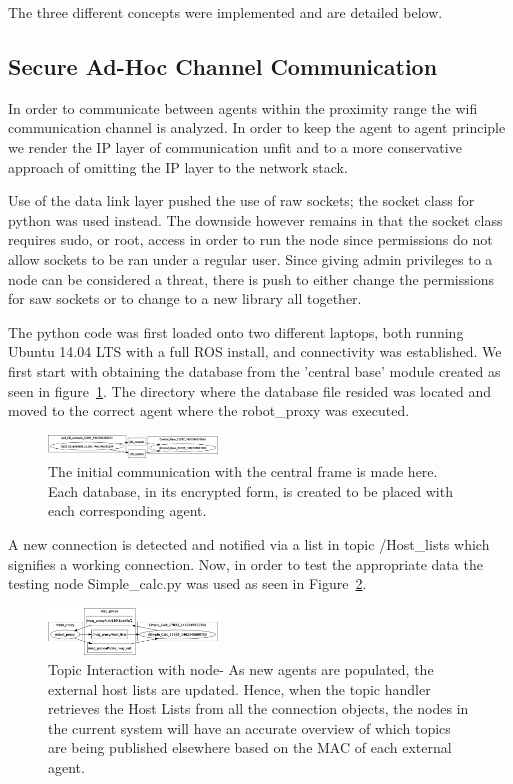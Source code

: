 \documentclass[conference]{IEEEtran}
\begin{document}
The three different concepts were implemented and are detailed below.

\subsection{Secure Ad-Hoc Channel Communication}

In order to communicate between agents within the proximity range the wifi communication channel is analyzed. In order to keep the agent to agent principle we render the IP layer of communication unfit and to a more conservative approach of omitting the IP layer to the network stack.

Use of the data link layer pushed the use of raw sockets; the socket class for python was used instead. The downside however remains in that the socket class requires sudo, or root, access in order to run the node since permissions do not allow sockets to be ran under a regular user. Since giving admin privileges to a node can be considered a threat, there is push to either change the permissions for saw sockets or to change to a new library all together.

The python code was first loaded onto two different laptops, both running Ubuntu 14.04 LTS with a full ROS install, and connectivity was established. We first start with obtaining the database from the 'central base' module created as seen in figure~\ref{fig:TopicIntr1}. The directory where the database file resided was located and moved to the correct agent where the robot\_proxy was executed.

\begin{figure}[]
\centering
\includegraphics[width=0.4\textwidth]{TopicIntr1}
\caption{The initial communication with the central frame is made here. Each database, in its encrypted form, is created to be placed with each corresponding agent.}
\label{fig:TopicIntr1}
\end{figure}

A new connection is detected and notified via a list in topic /Host\_lists which signifies a working connection. Now, in order to test the appropriate data the testing node Simple\_calc.py was used as seen in Figure~\ref{fig:TopicIntr2}.

\begin{figure}[]
\centering
\includegraphics[width=0.4\textwidth]{TopicIntr2}
\caption{Topic Interaction with node- As new agents are populated, the external host lists are updated. Hence, when the topic handler retrieves the Host Lists from all the connection objects, the nodes in the current system will have an accurate overview of which topics are being published elsewhere based on the MAC of each external agent.}
\label{fig:TopicIntr2}
\end{figure}
\end{document}
